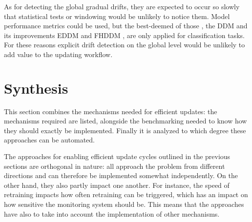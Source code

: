 As for detecting the global gradual drifts, they are expected to occur so slowly that statistical tests or windowing would be unlikely to notice them. Model performance metrics could be used, but the best-deemed of those \cite{celikAdaptationStrategiesAutomated2021} \cite{madridAutoMLPresenceDrift2019}, the DDM \cite{gamaLearningDriftDetection2004} and its improvements EDDM \cite{baena-garciaEarlyDriftDetection2006} and FHDDM \cite{pesaranghaderFastHoeffdingDrift2016}, are only applied for classification tasks. For these reasons explicit drift detection on the global level would be unlikely to add value to the updating workflow. 


\section{Synthesis}

This section combines the mechanisms needed for efficient updates: the mechanisms required are listed, alongside the benchmarking needed to know how they should exactly be implemented. Finally it is analyzed to which degree these approaches can be automated.


The approaches for enabling efficient update cycles outlined in the previous sections are orthogonal in nature: all approach the problem from different directions and can therefore be implemented somewhat independently. On the other hand, they also partly impact one another. For instance, the speed of retraining impacts how often retraining can be triggered, which has an impact on how sensitive the monitoring system should be. This means that the approaches have also to take into account the implementation of other mechanisms.

